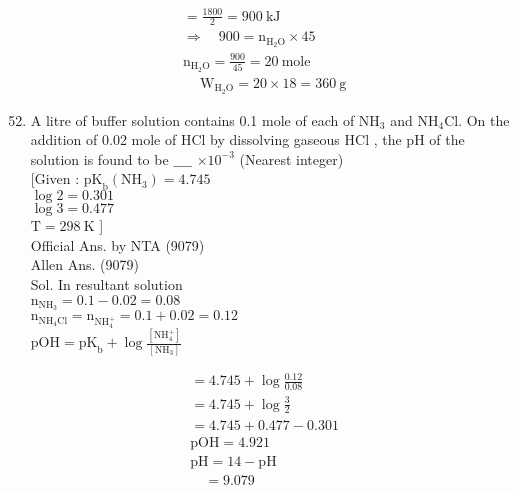\documentclass[10pt]{article}
\begin{document}
\[
\begin{aligned}
& =\frac{1800}{2}=900 \mathrm{~kJ} \\
& \Rightarrow \quad 900=\mathrm{n}_{\mathrm{H}_{2} \mathrm{O}} \times 45 \\
& \mathrm{n}_{\mathrm{H}_{2} \mathrm{O}}=\frac{900}{45}=20 \mathrm{~mole} \\
& \quad \mathrm{~W}_{\mathrm{H}_{2} \mathrm{O}}=20 \times 18=360 \mathrm{~g}
\end{aligned}
\]

\begin{enumerate}
  \setcounter{enumi}{51}
  \item A litre of buffer solution contains 0.1 mole of each of \(\mathrm{NH}_{3}\) and \(\mathrm{NH}_{4} \mathrm{Cl}\). On the addition of 0.02 mole of HCl by dissolving gaseous HCl , the pH of the solution is found to be \(\_\_\_\_\) \(\times 10^{-3}\) (Nearest integer)\\[0pt]
[Given : \(\mathrm{pK}_{\mathrm{b}}\left(\mathrm{NH}_{3}\right)=4.745\)\\
\(\log 2=0.301\)\\
\(\log 3=0.477\)\\
\(\mathrm{T}=298 \mathrm{~K}\) ]\\
Official Ans. by NTA (9079)\\
Allen Ans. (9079)\\
Sol. In resultant solution\\
\(\mathrm{n}_{\mathrm{NH}_{3}}=0.1-0.02=0.08\)\\
\(\mathrm{n}_{\mathrm{NH}_{4} \mathrm{Cl}}=\mathrm{n}_{\mathrm{NH}_{4}^{+}}=0.1+0.02=0.12\)\\
\(\mathrm{pOH}=\mathrm{pK}_{\mathrm{b}}+\log \frac{\left[\mathrm{NH}_{4}^{+}\right]}{\left[\mathrm{NH}_{3}\right]}\)
\end{enumerate}

\[
\begin{aligned}
& =4.745+\log \frac{0.12}{0.08} \\
& =4.745+\log \frac{3}{2} \\
& =4.745+0.477-0.301 \\
& \mathrm{pOH}=4.921 \\
& \mathrm{pH}=14-\mathrm{pH} \\
& \quad=9.079
\end{aligned}
\]
\end{document}
